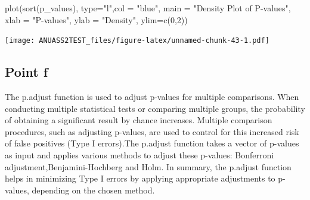 \documentclass[
]{article}
\newenvironment{Shaded}{\begin{snugshade}}{\end{snugshade}}
\newcommand{\AttributeTok}[1]{\textcolor[rgb]{0.77,0.63,0.00}{#1}}
\newcommand{\DecValTok}[1]{\textcolor[rgb]{0.00,0.00,0.81}{#1}}
\newcommand{\FunctionTok}[1]{\textcolor[rgb]{0.00,0.00,0.00}{#1}}
\newcommand{\NormalTok}[1]{#1}
\newcommand{\StringTok}[1]{\textcolor[rgb]{0.31,0.60,0.02}{#1}}
\begin{document}
\begin{Shaded}
\begin{Highlighting}[]
\FunctionTok{plot}\NormalTok{(}\FunctionTok{sort}\NormalTok{(p\_values), }\AttributeTok{type=}\StringTok{"l"}\NormalTok{,}\AttributeTok{col =} \StringTok{"blue"}\NormalTok{, }\AttributeTok{main =} \StringTok{"Density Plot of P{-}values"}\NormalTok{, }\AttributeTok{xlab =} \StringTok{"P{-}values"}\NormalTok{, }\AttributeTok{ylab =} \StringTok{"Density"}\NormalTok{, }\AttributeTok{ylim=}\FunctionTok{c}\NormalTok{(}\DecValTok{0}\NormalTok{,}\DecValTok{2}\NormalTok{))}
\end{Highlighting}
\end{Shaded}

\texttt{[image: ANUASS2TEST\_files/figure-latex/unnamed-chunk-43-1.pdf]}

\hypertarget{point-f-2}{%
\subsection{Point f}\label{point-f-2}}

The p.adjust function is used to adjust p-values for multiple
comparisons. When conducting multiple statistical tests or comparing
multiple groups, the probability of obtaining a significant result by
chance increases. Multiple comparison procedures, such as adjusting
p-values, are used to control for this increased risk of false positives
(Type I errors).The p.adjust function takes a vector of p-values as
input and applies various methods to adjust these p-values: Bonferroni
adjustment,Benjamini-Hochberg and Holm. In summary, the p.adjust
function helps in minimizing Type I errors by applying appropriate
adjustments to p-values, depending on the chosen method.
\end{document}
